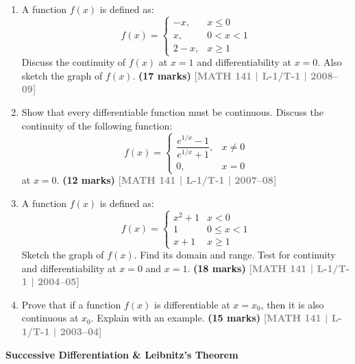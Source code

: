 \documentclass[12pt,a3paper]{article}
\newcommand{\yr}[1]{\hfill\textcolor{gray}{\small\textbf{[#1]}}}
\newcommand{\mk}[1]{\textcolor{orange!70!black}{\small\textbf{(#1 marks)}}}
\newcommand{\subtopic}[2]{%
  \vspace{10pt}
  \noindent\begin{tcolorbox}[colback=#1!8,colframe=#1,boxrule=0.6pt,arc=4pt,
    left=6pt,right=6pt,top=4pt,bottom=4pt]
    \small\bfseries\textcolor{#1}{#2}
  \end{tcolorbox}
  \vspace{2pt}
}
\begin{document}
\begin{enumerate}
\item A function $f(x)$ is defined as:
\[
f(x)=\begin{cases}-x, & x\le 0\\ x, & 0<x<1\\ 2-x, & x\ge 1\end{cases}
\]
Discuss the continuity of $f(x)$ at $x=1$ and differentiability at $x=0$. Also sketch the graph of $f(x)$.
\mk{17} \yr{MATH 141 | L-1/T-1 | 2008--09}

\item Show that every differentiable function must be continuous. Discuss the continuity of the following function:
\[
f(x)=\begin{cases}\dfrac{e^{1/x}-1}{e^{1/x}+1}, & x\neq 0\\[6pt] 0, & x=0\end{cases}
\]
at $x=0$.
\mk{12} \yr{MATH 141 | L-1/T-1 | 2007--08}

\item A function $f(x)$ is defined as:
\[
f(x)=\begin{cases}x^{2}+1 & x<0\\ 1 & 0\le x<1\\ x+1 & x\ge 1\end{cases}
\]
Sketch the graph of $f(x)$. Find its domain and range. Test for continuity and differentiability at $x=0$ and $x=1$.
\mk{18} \yr{MATH 141 | L-1/T-1 | 2004--05}

\item Prove that if a function $f(x)$ is differentiable at $x=x_{0}$, then it is also continuous at $x_{0}$. Explain with an example.
\mk{15} \yr{MATH 141 | L-1/T-1 | 2003--04}

\end{enumerate}
\subtopic{cA}{Successive Differentiation \& Leibnitz's Theorem}
\label{sub:s1-succ}
\end{document}
